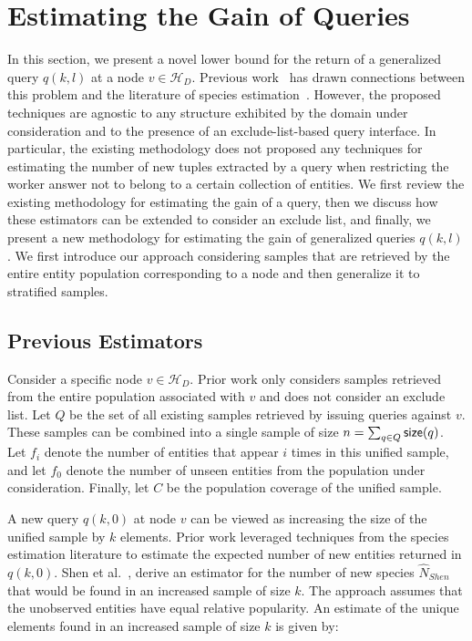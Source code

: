 \documentclass{vldb}
\newcommand{\hierarchy}{\mathcal{H}_D}
\begin{document}
\section{Estimating the Gain of Queries}
\label{sec:gainestimators}
In this section, we present a novel lower bound for the return of a generalized query $q(k,l)$ at a node $v \in \hierarchy$. Previous work~\cite{trushkowsky:2013} has drawn connections between this problem and the literature of species estimation~\cite{chao:1992}. However,  the proposed techniques are agnostic to any structure exhibited by the domain under consideration and to the presence of an exclude-list-based query interface. In particular, the existing methodology does not proposed any techniques for estimating the number of new tuples extracted by a query when restricting the worker answer not to belong to a certain collection of entities. We first review the existing methodology for estimating the gain of a query, then we discuss how these estimators can be extended to consider an exclude list, and finally, we present a new methodology for estimating the gain of generalized queries $q(k,l)$. We first introduce our approach considering samples that are retrieved by the entire entity population corresponding to a node and then generalize it to stratified samples.

\subsection{Previous Estimators} 
Consider a specific node $v \in \hierarchy$. Prior work only considers samples retrieved from the entire population associated with $v$ and does not consider an exclude list. Let $Q$ be the set of all existing samples retrieved by issuing queries against $v$. These samples can be combined into a single sample of size $n = \sum_{q \in Q} {\sf size}(q)$. Let $f_i$ denote the number of entities that appear $i$ times in this unified sample, and let $f_0$ denote the number of unseen entities from the population under consideration. Finally, let $C$ be the population coverage of the unified sample.

A new query $q(k,0)$ at node $v$ can be viewed as increasing the size of the unified sample by $k$ elements. Prior work leveraged techniques from the species estimation literature to estimate the expected number of new entities returned in $q(k,0)$. Shen et al.~\cite{shen:2003}, derive an estimator for the number of new species $\hat{N}_{Shen}$ that would be found in an increased sample of size $k$. The approach assumes that the unobserved entities have equal relative popularity. An estimate of the unique elements found in an increased sample of size $k$ is given by:
\end{document}
